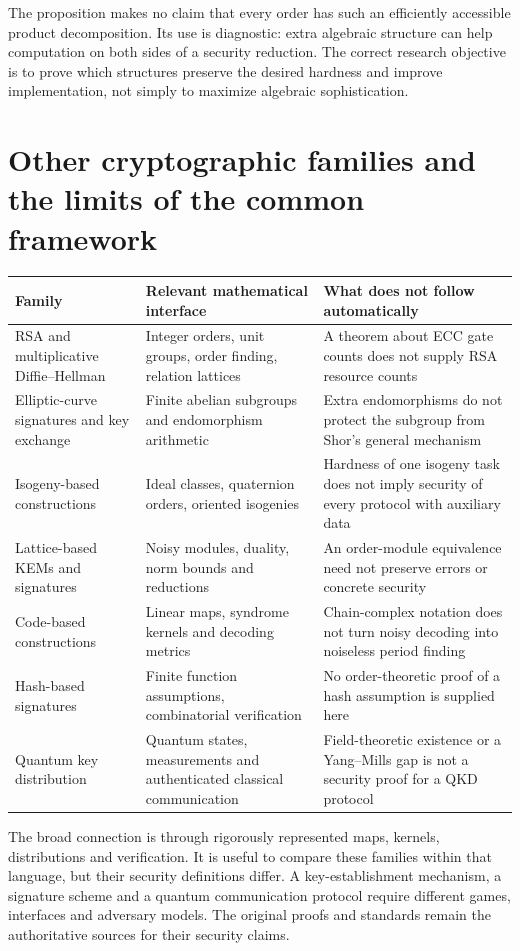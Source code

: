 The proposition makes no claim that every order has such an efficiently accessible product decomposition. Its use is diagnostic: extra algebraic structure can help computation on both sides of a security reduction. The correct research objective is to prove which structures preserve the desired hardness and improve implementation, not simply to maximize algebraic sophistication.

\section{Other cryptographic families and the limits of the common framework}
\begin{longtable}{p{}p{}p{}}
\toprule
Family & Relevant mathematical interface & What does not follow automatically\\\midrule
RSA and multiplicative Diffie--Hellman & Integer orders, unit groups, order finding, relation lattices & A theorem about ECC gate counts does not supply RSA resource counts\\
Elliptic-curve signatures and key exchange & Finite abelian subgroups and endomorphism arithmetic & Extra endomorphisms do not protect the subgroup from Shor's general mechanism\\
Isogeny-based constructions & Ideal classes, quaternion orders, oriented isogenies & Hardness of one isogeny task does not imply security of every protocol with auxiliary data\\
Lattice-based KEMs and signatures & Noisy modules, duality, norm bounds and reductions & An order-module equivalence need not preserve errors or concrete security\\
Code-based constructions & Linear maps, syndrome kernels and decoding metrics & Chain-complex notation does not turn noisy decoding into noiseless period finding\\
Hash-based signatures & Finite function assumptions, combinatorial verification & No order-theoretic proof of a hash assumption is supplied here\\
Quantum key distribution & Quantum states, measurements and authenticated classical communication & Field-theoretic existence or a Yang--Mills gap is not a security proof for a QKD protocol\\\bottomrule
\end{longtable}

The broad connection is through rigorously represented maps, kernels, distributions and verification. It is useful to compare these families within that language, but their security definitions differ. A key-establishment mechanism, a signature scheme and a quantum communication protocol require different games, interfaces and adversary models. The original proofs and standards remain the authoritative sources for their security claims.

